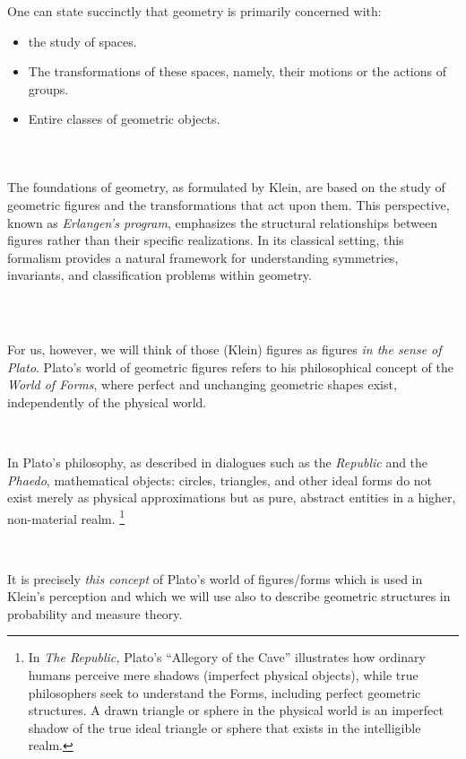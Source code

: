 One can state succinctly that geometry is primarily concerned with:  
\begin{itemize}
    \item the study of spaces.
    \item The transformations of these spaces, namely, their motions or the actions of groups.  
    \item Entire classes of geometric objects.  
\end{itemize}

\, 

\subsubsection{}
The foundations of geometry, as formulated by Klein, are based on the study of geometric figures and the transformations that act upon them. This perspective, known as \textit{Erlangen’s program}, emphasizes the structural relationships between figures rather than their specific realizations. In its classical setting, this formalism provides a natural framework for understanding symmetries, invariants, and classification problems within geometry.

\,

\subsection{}
For us, however, we will think of those (Klein) figures as figures {\it in the sense of Plato}. Plato's world of geometric figures refers to his philosophical concept of the {\it World of Forms}, where perfect and unchanging geometric shapes exist, independently of the physical world.

\, 

In Plato's philosophy, as described in dialogues such as the \emph{Republic} and the \emph{Phaedo}, mathematical objects: circles, triangles, and other ideal forms do not exist merely as physical approximations but as pure, abstract entities in a higher, non-material realm.
\footnote{In {\it The Republic,} Plato’s ``Allegory of the Cave'' illustrates how ordinary humans perceive mere shadows (imperfect physical objects), while true philosophers seek to understand the Forms, including perfect geometric structures. A drawn triangle or sphere in the physical world is an imperfect shadow of the true ideal triangle or sphere that exists in the intelligible realm.}

\,

It is precisely {\it this concept} of Plato's world of figures/forms which is used in Klein's perception and which we will use also to describe geometric structures in probability and measure theory.  
 
